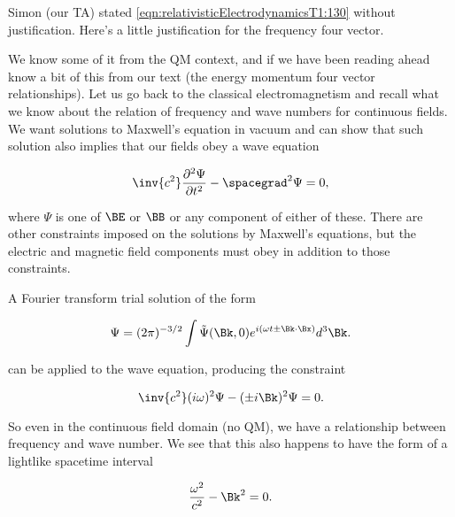 %
%

Simon (our TA) stated \cref{eqn:relativisticElectrodynamicsT1:130} without justification.  Here's a little justification for the frequency four vector.

We know some of it from the QM context, and if we have been reading ahead know a bit of this from our text \citep{landau1980classical} (the energy momentum four vector relationships).  Let us go back to the classical electromagnetism and recall what we know about the relation of frequency and wave numbers for continuous fields.  We want solutions to Maxwell's equation in vacuum and can show that such solution also implies that our fields obey a wave equation

\begin{equation}\label{eqn:relativisticElectrodynamicsT1:131}
\inv{c^2} \frac{\partial^2 \Psi}{\partial t^2} - \spacegrad^2 \Psi = 0,
\end{equation}

where $\Psi$ is one of $\BE$ or $\BB$ or any component of either of these.  There are other constraints imposed on the solutions by Maxwell's equations, but the electric and magnetic field components must obey  in addition to those constraints.

A Fourier transform trial solution of the form

\begin{equation}\label{eqn:relativisticElectrodynamicsT1:132}
\Psi = (2 \pi)^{-3/2} \int \tilde{\Psi}(\Bk, 0) e^{i (\omega t \pm \Bk \cdot \Bx) } d^3 \Bk.
\end{equation}

can be applied to the wave equation, producing the constraint

\begin{equation}\label{eqn:relativisticElectrodynamicsT1:133}
\inv{c^2} (i \omega)^2 \Psi - (\pm i \Bk)^2 \Psi = 0.
\end{equation}

So even in the continuous field domain (no QM), we have a relationship between frequency and wave number.  We see that this also happens to have the form of a lightlike spacetime interval

\begin{equation}\label{eqn:relativisticElectrodynamicsT1:134}
\frac{\omega^2}{c^2} - \Bk^2 = 0.
\end{equation}

